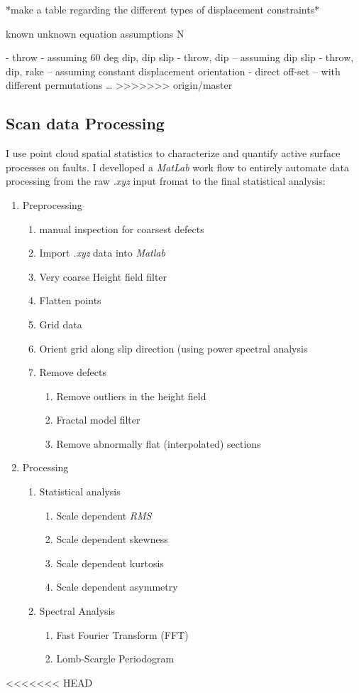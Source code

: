 \documentclass[12pt,a4paper]{article}
\begin{document}
*make a table regarding the different types of displacement constraints*

known 		unknown 	equation 	assumptions		N

- throw - assuming 60 deg dip, dip slip 
- throw, dip – assuming dip slip 
- throw, dip, rake – assuming constant displacement orientation
- direct off-set – with different permutations …
>>>>>>> origin/master

	\subsection{Scan data Processing}

I use point cloud spatial statistics to characterize and quantify active surface processes on faults. I develloped a \textit{MatLab} work flow to entirely automate data processing from the raw \textit{.xyz} input fromat to the final statistical analysis:

\begin{enumerate}
	\item Preprocessing
	\begin{enumerate}
		\item manual inspection for coarsest defects
		\item Import \textit{.xyz} data into \textit{Matlab}
		\item Very coarse Height field filter
		\item Flatten points
		\item Grid data
		\item Orient grid along slip direction (using power spectral analysis 
		\item Remove defects
		\begin{enumerate}
			\item Remove outliers in the height field
			\item Fractal model filter
			\item Remove abnormally flat (interpolated) sections
		\end{enumerate}
	\end{enumerate}
	\item Processing
	\begin{enumerate}
		\item Statistical analysis
		\begin{enumerate}
			\item Scale dependent \textit{RMS}
			\item Scale dependent skewness
			\item Scale dependent kurtosis
			\item Scale dependent asymmetry
		\end{enumerate}
		\item Spectral Analysis
		\begin{enumerate}
			\item Fast Fourier Transform (FFT)
			\item Lomb-Scargle Periodogram
		\end{enumerate}
	\end{enumerate}
\end{enumerate}
<<<<<<< HEAD
\end{document}
